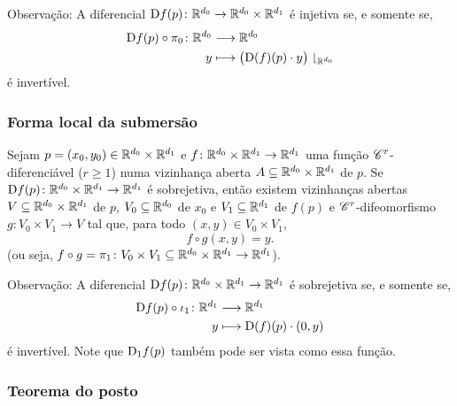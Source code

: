 Observação: A diferencial $\mathrm{D} f(p)\colon \mathbb{R}^{d_0} \to \mathbb{R}^{d_0} \times \mathbb{R}^{d_1}$ é injetiva se, e somente se,
	\begin{align*}
	{\mathrm{D}f(p) \circ \pi_0}\colon {\mathbb{R}^{d_0}} &\longrightarrow {\mathbb{R}^{d_0}} \\{y} &\longmapsto \big(\mathrm{D}(f)(p) \cdot y\big)\downharpoonright_{\mathbb{R}^{d_0}}
	\end{align*}
é invertível.


\subsubsection{Forma local da submersão}

\begin{proposition}

Sejam $p=(x_0,y_0) \in \mathbb{R}^{d_0} \times \mathbb{R}^{d_1}$ e $f\colon \mathbb{R}^{d_0} \times \mathbb{R}^{d_1} \to \mathbb{R}^{d_1}$ uma função $\mathscr{C}^r$-diferenciável ($r \geq 1$) numa vizinhança aberta $A \subseteq \mathbb{R}^{d_0} \times \mathbb{R}^{d_1}$ de $p$. Se $\mathrm{D} f(p)\colon \mathbb{R}^{d_0} \times \mathbb{R}^{d_1} \to \mathbb{R}^{d_1}$ é sobrejetiva, então existem vizinhanças abertas $V \subseteq \mathbb{R}^{d_0} \times \mathbb{R}^{d_1}$ de $p$, $V_0 \subseteq \mathbb{R}^{d_0}$ de $x_0$ e $V_1 \subseteq \mathbb{R}^{d_1}$ de $f(p)$ e $\mathscr{C}^r$-difeomorfismo $g\colon V_0 \times V_1 \to V$ tal que, para todo $(x,y) \in V_0 \times V_1$,
	\begin{equation*}
	f \circ g(x,y)=y.
	\end{equation*}
(ou seja, $f \circ g = \pi_1\colon V_0 \times V_1 \subseteq \mathbb{R}^{d_0} \times \mathbb{R}^{d_1} \to \mathbb{R}^{d_1}$).
\end{proposition}

Observação: A diferencial $\mathrm{D} f(p)\colon \mathbb{R}^{d_0} \times \mathbb{R}^{d_1} \to \mathbb{R}^{d_1}$ é sobrejetiva se, e somente se,
	\begin{align*}
	{\mathrm{D}f(p) \circ \iota_1}\colon {\mathbb{R}^{d_1}} &\longrightarrow {\mathbb{R}^{d_1}} \\{y} &\longmapsto \mathrm{D}(f)(p) \cdot (0,y)
	\end{align*}
é invertível. Note que $\mathrm{D}_1 f(p)$ também pode ser vista como essa função.

\subsubsection{Teorema do posto}

